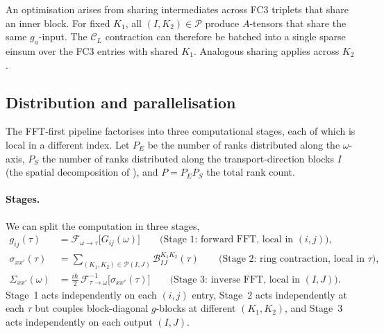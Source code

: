 An optimisation arises from sharing intermediates across FC3 triplets
that share an inner block. For fixed $K_1$, all
$(I,K_2)\in\mathcal{P}$ produce $A$-tensors that share the same
$g_a$-input. The $\mathcal{C}_L$ contraction can therefore be
batched into a single sparse einsum over the FC3 entries with
shared $K_1$. Analogous sharing
applies across $K_2$.

\subsection{Distribution and parallelisation}
\label{ssec:phph_distribution}

The FFT-first pipeline factorises into three computational stages,
each of which is local in a different index. Let $P_E$ be the number of
ranks distributed along the $\omega$-axis, $P_S$ the number of ranks
distributed along the transport-direction blocks $I$ (the spatial
decomposition of \cite{vetsch_ab-initio_2025}), and $P=P_E P_S$ the
total rank count.

\paragraph{Stages.} We can split the computation in three stages,
\begin{align}
  g_{ij}(\tau)
    &= \mathcal{F}_{\omega\to\tau}\bigl[G_{ij}(\omega)\bigr]
    \qquad\text{(Stage~1: forward FFT, local in $(i,j)$)},
    \label{eq:phph_stage1}\\
  \sigma_{xx'}(\tau)
    &= \!\!\sum_{(K_1,K_2)\in\mathcal{P}(I,J)}\!\!
       \mathcal{B}_{IJ}^{K_1K_2}(\tau)
    \qquad\text{(Stage~2: ring contraction, local in $\tau$)},
    \label{eq:phph_stage2}\\
  \Sigma_{xx'}(\omega)
    &= \tfrac{i\hbar}{2}\,
       \mathcal{F}^{-1}_{\tau\to\omega}\bigl[\sigma_{xx'}(\tau)\bigr]
    \qquad\text{(Stage~3: inverse FFT, local in $(I,J)$)}.
    \label{eq:phph_stage3}
\end{align}
Stage~1 acts independently on each $(i,j)$ entry, Stage~2 acts independently at
each $\tau$ but couples block-diagonal $g$-blocks at different
$(K_1,K_2)$, and Stage~3 acts independently on each output $(I,J)$.


